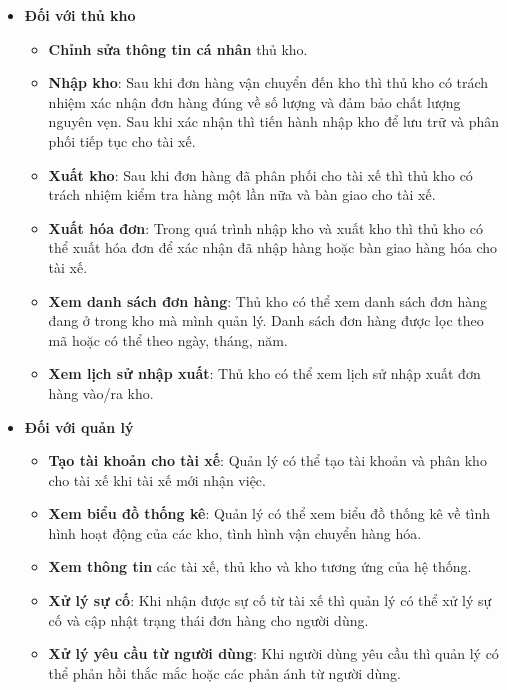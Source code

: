 \begin{itemize}
	                
				\item \textbf{Đối với thủ kho}
			    	\begin{itemize}
			    	    \item \textbf{Chỉnh sửa thông tin cá nhân} thủ kho.
	                    \item \textbf{Nhập kho}: Sau khi đơn hàng vận chuyển đến kho thì thủ kho có trách nhiệm xác nhận đơn hàng đúng về số lượng và đảm bảo chất lượng nguyên vẹn. Sau khi xác nhận thì tiến hành nhập kho để lưu trữ và phân phối tiếp tục cho tài xế.
	                    \item \textbf{Xuất kho}: Sau khi đơn hàng đã phân phối cho tài xế thì thủ kho có trách nhiệm kiểm tra hàng một lần nữa và bàn giao cho tài xế. 
	                    \item \textbf{Xuất hóa đơn}: Trong quá trình nhập kho và xuất kho thì thủ kho có thể xuất hóa đơn để xác nhận đã nhập hàng hoặc bàn giao hàng hóa cho tài xế.
	                    \item \textbf{Xem danh sách đơn hàng}: Thủ kho có thể xem danh sách đơn hàng đang ở trong kho mà mình quản lý. Danh sách đơn hàng được lọc theo mã hoặc có thể theo ngày, tháng, năm.
	                    \item \textbf{Xem lịch sử nhập xuất}: Thủ kho có thể xem lịch sử nhập xuất đơn hàng vào/ra kho.
	                \end{itemize}
	                
	                
				\item \textbf{Đối với quản lý}
				    \begin{itemize}
	                    \item \textbf{Tạo tài khoản cho tài xế}: Quản lý có thể tạo tài khoản và phân kho cho tài xế khi tài xế mới nhận việc.
	                    \item \textbf{Xem biểu đồ thống kê}: Quản lý có thể xem biểu đồ thống kê về tình hình hoạt động của các kho, tình hình vận chuyển hàng hóa.
	                    \item \textbf{Xem thông tin} các tài xế, thủ kho và kho tương ứng của hệ thống.
	                    \item \textbf{Xử lý sự cố}: Khi nhận được sự cố từ tài xế thì quản lý có thể xử lý sự cố và cập nhật trạng thái đơn hàng cho người dùng.
	                    \item \textbf{Xử lý yêu cầu từ người dùng}: Khi người dùng yêu cầu thì quản lý có thể phản hồi thắc mắc hoặc các phản ánh từ người dùng.
	                \end{itemize}
		\end{itemize}
    
